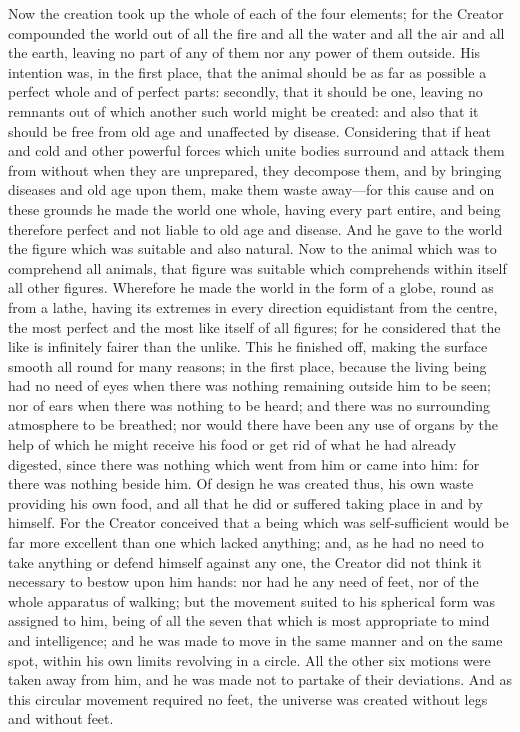 Now the creation took up the whole of each of the four elements; for the
Creator compounded the world out of all the fire and all the water and all
the air and all the earth, leaving no part of any of them nor any power of
them outside. His intention was, in the first place, that the animal
should be as far as possible a perfect whole and of perfect parts:
secondly, that it should be one, leaving no remnants out of which another
such world might be created: and also that it should be free from old age
and unaffected by disease. Considering that if heat and cold and other
powerful forces which unite bodies surround and attack them from without
when they are unprepared, they decompose them, and by bringing diseases
and old age upon them, make them waste away—for this cause and on
these grounds he made the world one whole, having every part entire, and
being therefore perfect and not liable to old age and disease. And he gave
to the world the figure which was suitable and also natural. Now to the
animal which was to comprehend all animals, that figure was suitable which
comprehends within itself all other figures. Wherefore he made the world
in the form of a globe, round as from a lathe, having its extremes in
every direction equidistant from the centre, the most perfect and the most
like itself of all figures; for he considered that the like is infinitely
fairer than the unlike. This he finished off, making the surface smooth
all round for many reasons; in the first place, because the living being
had no need of eyes when there was nothing remaining outside him to be
seen; nor of ears when there was nothing to be heard; and there was no
surrounding atmosphere to be breathed; nor would there have been any use
of organs by the help of which he might receive his food or get rid of
what he had already digested, since there was nothing which went from him
or came into him: for there was nothing beside him. Of design he was
created thus, his own waste providing his own food, and all that he did or
suffered taking place in and by himself. For the Creator conceived that a
being which was self-sufficient would be far more excellent than one which
lacked anything; and, as he had no need to take anything or defend himself
against any one, the Creator did not think it necessary to bestow upon him
hands: nor had he any need of feet, nor of the whole apparatus of walking;
but the movement suited to his spherical form was assigned to him, being
of all the seven that which is most appropriate to mind and intelligence;
and he was made to move in the same manner and on the same spot, within
his own limits revolving in a circle. All the other six motions were taken
away from him, and he was made not to partake of their deviations. And as
this circular movement required no feet, the universe was created without
legs and without feet.

